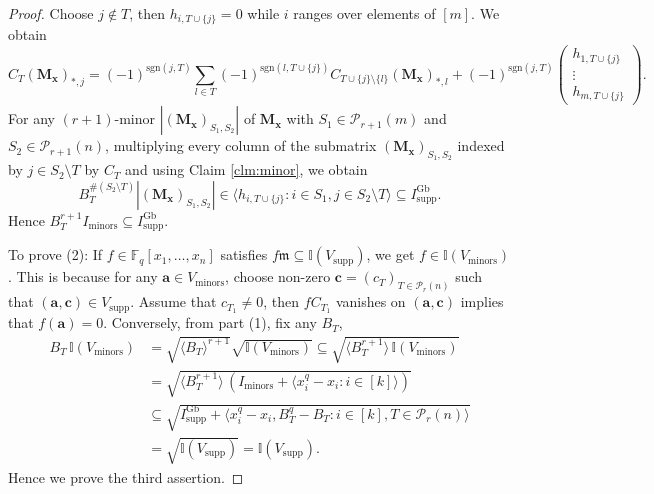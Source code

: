 \documentclass[a4paper, 11pt]{amsart}
\newcommand{\mc}[1]{\mathcal{#1}}
\newcommand{\mf}[1]{\mathfrak{#1}}
\newcommand{\mb}[1]{\mathbb{#1}}
\newcommand{\ideala}[1]{\langle{#1}\rangle}
\newcommand{\ssm}[1]{\sum_{#1}}
\newcommand{\td}[1]{\bm{#1}}
\newcommand{\tx}[1]{\text{#1}}
\newcommand{\fq}{\mathbb{F}_q}
\theoremstyle{definition}
\theoremstyle{definition}
\begin{document}
	\begin{proof}
		Choose $j\notin T$, then $h_{i,T\cup\{j\}}=0$ while $i$ ranges over elements of $[m]$. We obtain
		\begin{equation*}
			C_T(\td{M_x})_{*,j}=(-1)^{\tx{sgn}(j,T)}\ssm{l\in T}(-1)^{\tx{sgn}(l,T\cup\{j\})}C_{T\cup\{j\}\setminus\{l\}}(\td{M_x})_{*,l}+
			(-1)^{\tx{sgn}(j,T)}\begin{pmatrix}
				h_{1,T\cup\{j\}}\\
				\vdots\\
				h_{m,T\cup\{j\}}
			\end{pmatrix}.
		\end{equation*}
		For any $(r+1)$-minor $|(\td{M_x})_{S_1,S_2}|$ of $\td{M_x}$ with $S_1\in\mc{P}_{r+1}(m)$ and $S_2\in\mc{P}_{r+1}(n)$,  multiplying every column of the submatrix $(\td{M_x})_{S_1,S_2}$ indexed by $j\in S_2\setminus T$ by $C_T$ and using Claim \ref{clm:minor}, we obtain
		\begin{equation*}
			B_T^{\#(S_2\setminus T)}|(\td{M_x})_{S_1,S_2}|\in\ideala{h_{i,T\cup\{j\}}:i\in S_1,j\in S_2\setminus T}\subseteq I^{\tx{Gb}}_{\tx{supp}}.
		\end{equation*}
		Hence $B_T^{r+1}I_{\tx{minors}}\subseteq I^{\tx{Gb}}_{\tx{supp}}$.
		
		To prove (2): If $f\in\fq[x_1,\dots,x_n]$ satisfies $f\mf{m}\subseteq \mb{I}(V_{\tx{supp}})$, we get $f\in \mb{I}(V_{\tx{minors}})$. This is because for any $\td{a}\in V_{\tx{minors}}$, choose non-zero $\td{c}=(c_T)_{T\in\mc{P}_r(n)}$ such that $(\td{a},\td{c})\in V_{\tx{supp}}$. Assume that $c_{T_1}\neq 0$, then $fC_{T_1}$ vanishes on $(\td{a},\td{c})$ implies that $f(\td{a})=0$. Conversely, from part (1), fix any $B_T$,
		\begin{align*}
			B_T\,\mb{I}(V_{\tx{minors}})&= \sqrt{\ideala{B_T}^{r+1}}\sqrt{\mb{I}(V_{\tx{minors}})}\subseteq\sqrt{\ideala{B_T^{r+1}}\,\mb{I}(V_{\tx{minors}})}\\&=\sqrt{\ideala{B_T^{r+1}}\,(I_{\tx{minors}}+\ideala{x_i^q-x_i:i\in[k]})}\\
			&\subseteq\sqrt{I^{\tx{Gb}}_{\tx{supp}}+\ideala{x_i^q-x_i,B_T^q-B_T:i\in[k],T\in\mc{P}_r(n)}}\\
			&=\sqrt{\mb{I}(V_{\tx{supp}})}=\mb{I}(V_{\tx{supp}}).
		\end{align*}
		Hence we prove the third assertion.
	\end{proof}
	
	
	
\end{document}
